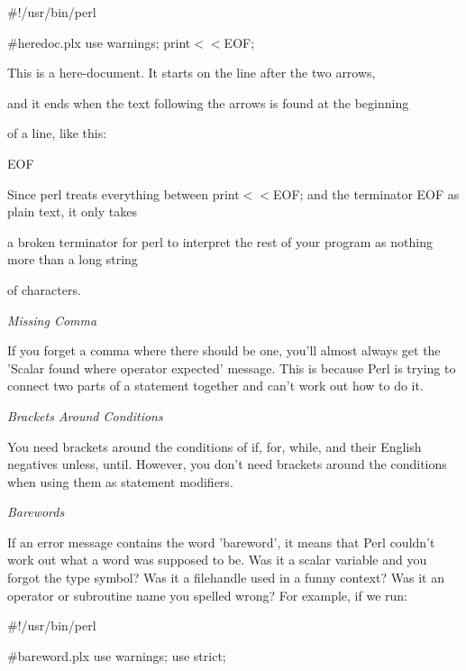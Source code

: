 \documentclass[a4paper,11pt]{book}
\begin{document}
\noindent 

\noindent \#!/usr/bin/perl

\noindent \#heredoc.plx use warnings; print$<$$<$EOF;

\noindent 

\noindent This is a here-document. It starts on the line after the two arrows,

\noindent and it ends when the text following the arrows is found at the beginning

\noindent of a line, like this:

\noindent 

\noindent EOF

\noindent 

\noindent 

\noindent Since perl treats everything between print$<$$<$EOF; and the terminator EOF as plain text, it only takes

\noindent a broken terminator for perl to interpret the rest of your program as nothing more than a long string

\noindent of characters.

\noindent 

\noindent \textit{Missing Comma}

\noindent If you forget a comma where there should be one, you'll almost always get the 'Scalar found where operator expected' message. This is because Perl is trying to connect two parts of a statement together and can't work out how to do it.

\noindent 

\noindent \textit{Brackets Around Conditions}

\noindent You need brackets around the conditions of if, for, while, and their English negatives unless, until. However, you don't need brackets around the conditions when using them as statement modifiers.

\noindent 

\noindent \textit{Barewords}

\noindent If an error message contains the word 'bareword', it means that Perl couldn't work out what a word was supposed to be. Was it a scalar variable and you forgot the type symbol? Was it a filehandle used in a funny context? Was it an operator or subroutine name you spelled wrong? For example, if we run:

\noindent 

\noindent \#!/usr/bin/perl

\noindent \#bareword.plx use warnings; use strict;
\end{document}
